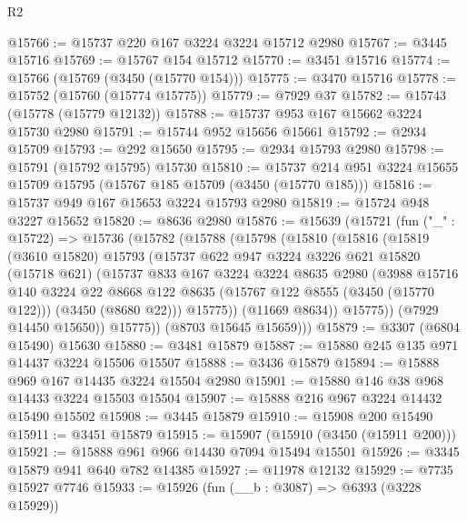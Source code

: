 \begin{lexlean}{R2}
\begin{coremodule}
@15766 := @15737 @220 @167 @3224 @3224 @15712 @2980
@15767 := @3445 @15716
@15769 := @15767 @154 @15712
@15770 := @3451 @15716
@15774 := @15766 (@15769 (@3450 (@15770 @154)))
@15775 := @3470 @15716
@15778 := @15752 (@15760 (@15774 @15775))
@15779 := @7929 @37
@15782 := @15743 (@15778 (@15779 @12132))
@15788 := @15737 @953 @167 @15662 @3224 @15730 @2980
@15791 := @15744 @952 @15656 @15661
@15792 := @2934 @15709
@15793 := @292 @15650
@15795 := @2934 @15793 @2980
@15798 := @15791 (@15792 @15795) @15730
@15810 := @15737 @214 @951 @3224 @15655 @15709 @15795 (@15767 @185 @15709 (@3450 (@15770 @185)))
@15816 := @15737 @949 @167 @15653 @3224 @15793 @2980
@15819 := @15724 @948 @3227 @15652
@15820 := @8636 @2980
@15876 := @15639
    (@15721
      (fun ("_" : @15722) =>
      @15736
        (@15782
          (@15788
            (@15798
              (@15810
                (@15816
                  (@15819
                    (@3610 @15820)
                    @15793
                    (@15737
                      @622
                      @947
                      @3224
                      @3226
                      @621
                      @15820
                      (@15718 @621)
                      (@15737
                        @833
                        @167
                        @3224
                        @3224
                        @8635
                        @2980
                        (@3988
                          @15716
                          @140
                          @3224
                          @22
                          @8668
                          @122
                          @8635
                          (@15767 @122 @8555 (@3450 (@15770 @122)))
                          (@3450 (@8680 @22)))
                        @15775))
                    (@11669 @8634))
                  @15775))
              (@7929 @14450 @15650))
            @15775))
        (@8703 @15645 @15659)))
@15879 := @3307 (@6804 @15490) @15630
@15880 := @3481 @15879
@15887 := @15880 @245 @135 @971 @14437 @3224 @15506 @15507
@15888 := @3436 @15879
@15894 := @15888 @969 @167 @14435 @3224 @15504 @2980
@15901 := @15880 @146 @38 @968 @14433 @3224 @15503 @15504
@15907 := @15888 @216 @967 @3224 @14432 @15490 @15502
@15908 := @3445 @15879
@15910 := @15908 @200 @15490
@15911 := @3451 @15879
@15915 := @15907 (@15910 (@3450 (@15911 @200)))
@15921 := @15888 @961 @966 @14430 @7094 @15494 @15501
@15926 := @3345 @15879 @941 @640 @782 @14385
@15927 := @11978 @12132
@15929 := @7735 @15927 @7746
@15933 := @15926 (fun (__b : @3087) => @6393 (@3228 @15929))

\end{coremodule}
\end{lexlean}

